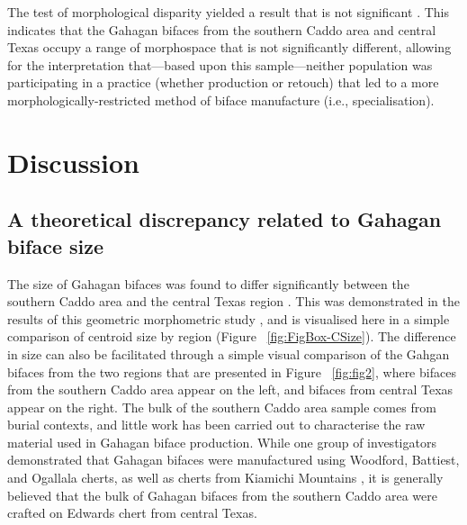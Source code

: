 \documentclass[review]{elsarticle}
\begin{document}
The test of morphological disparity yielded a result that is not significant \citep{RN20850}. This indicates that the Gahagan bifaces from the southern Caddo area and central Texas occupy a range of morphospace that is not significantly different, allowing for the interpretation that---based upon this sample---neither population was participating in a practice (whether production or retouch) that led to a more morphologically-restricted method of biface manufacture (i.e., specialisation).



\section*{Discussion}



\subsection*{A theoretical discrepancy related to Gahagan biface size}

The size of Gahagan bifaces was found to differ significantly between the southern Caddo area and the central Texas region \citep{RN20850}. This was demonstrated in the results of this geometric morphometric study \citep{RN20850}, and is visualised here in a simple comparison of centroid size by region (Figure ~\ref{fig:FigBox-CSize}). The difference in size can also be facilitated through a simple visual comparison of the Gahgan bifaces from the two regions that are presented in Figure ~\ref{fig:fig2}, where bifaces from the southern Caddo area appear on the left, and bifaces from central Texas appear on the right. The bulk of the southern Caddo area sample comes from burial contexts, and little work has been carried out to characterise the raw material used in Gahagan biface production. While one group of investigators demonstrated that Gahagan bifaces were manufactured using Woodford, Battiest, and Ogallala cherts, as well as cherts from Kiamichi Mountains \citep{RN1001}, it is generally believed that the bulk of Gahagan bifaces from the southern Caddo area were crafted on Edwards chert from central Texas.
\end{document}
